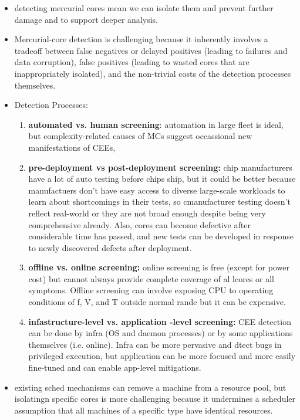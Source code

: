 \documentclass [12pt]{article}
\begin{document}
\begin{itemize}
            \begin{itemize}
                \item detecting mercurial cores mean we can isolate them and prevent further damage and to support deeper analysis. 
                \item Mercurial-core detection is challenging because it inherently involves a tradeoff between false negatives or delayed positives (leading to failures and data corruption), false positives (leading to wasted cores that are inappropriately isolated), and the non-trivial costs of the detection processes themselves.
                \item Detection Processes:
                    \begin{enumerate}
                        \item \textbf{automated vs. human screening}: automation in large fleet is ideal, but complexity-related causes of MCs suggest occassional new manifestations of CEEs, 
                        \item \textbf{pre-deployment vs post-deployment screening:} chip manufacturers have a lot of auto testing before chips ship, but it could be better because manufactuers don't have easy access to diverse large-scale workloads to learn about shortcomings in their tests, so cmanufacturer testing doesn't reflect real-world or they are not broad enough despite being very comprehensive already. Also, cores can become defective after considerable time has passed, and new tests can be developed in response to newly discovered defects after deployment. 
                        \item \textbf{offline vs. online screening:} online screening is free (except for power cost) but cannot always provide complete coverage of al lcores or all symptoms. Offline screening can involve exposing CPU to operating conditions of f, V, and T outside normal rande but it can be expensive. 
                        \item \textbf{infastructure-level vs. application -level screening:} CEE detection can be done by infra (OS and daemon processes) or by some applications themselves (i.e. online). Infra can be more pervasive and dtect bugs in privileged execution, but application can be more focused and more easily fine-tuned and can enable app-level mitigations. 
                    \end{enumerate}
                \item existing sched mechanisms can remove a machine from a resource pool, but isolatingn specific cores is more challenging because it undermines a scheduler assumption that all machines of a specific type have identical resources. 

\end{itemize}
\end{itemize}
\end{document}
